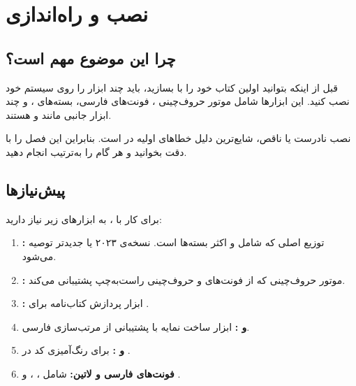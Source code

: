 
\chapter{نصب و راه‌اندازی}
\label{chap:installation}

\section{چرا این موضوع مهم است؟}
\label{sec:installation-why}

قبل از اینکه بتوانید اولین کتاب خود را با
 بسازید، باید چند ابزار را روی
سیستم خود نصب کنید. این ابزارها شامل موتور
حروف‌چینی ، فونت‌های فارسی، بسته‌های
، و چند ابزار جانبی مانند  و
 هستند.

نصب نادرست یا ناقص، شایع‌ترین دلیل خطاهای اولیه
در  است. بنابراین این فصل را
با دقت بخوانید و هر گام را به‌ترتیب انجام دهید.


\section{پیش‌نیازها}
\label{sec:installation-prerequisites}

برای کار با ، به ابزارهای زیر
نیاز دارید:

\begin{enumerate}
    \item \textbf{:} توزیع اصلی
     که شامل  و اکثر بسته‌ها
    است. نسخه‌ی ۲۰۲۳ یا جدیدتر توصیه می‌شود.

    \item \textbf{:} موتور حروف‌چینی
    که از فونت‌های  و حروف‌چینی
    راست‌به‌چپ پشتیبانی می‌کند.

    \item \textbf{:} ابزار پردازش
    کتاب‌نامه برای .

    \item \textbf{ و :}
    ابزار ساخت نمایه با پشتیبانی از مرتب‌سازی
    فارسی.

    \item \textbf{ و :}
    برای رنگ‌آمیزی کد در .

    \item \textbf{فونت‌های فارسی و لاتین:} شامل
    ، ، و
    .
\end{enumerate}

